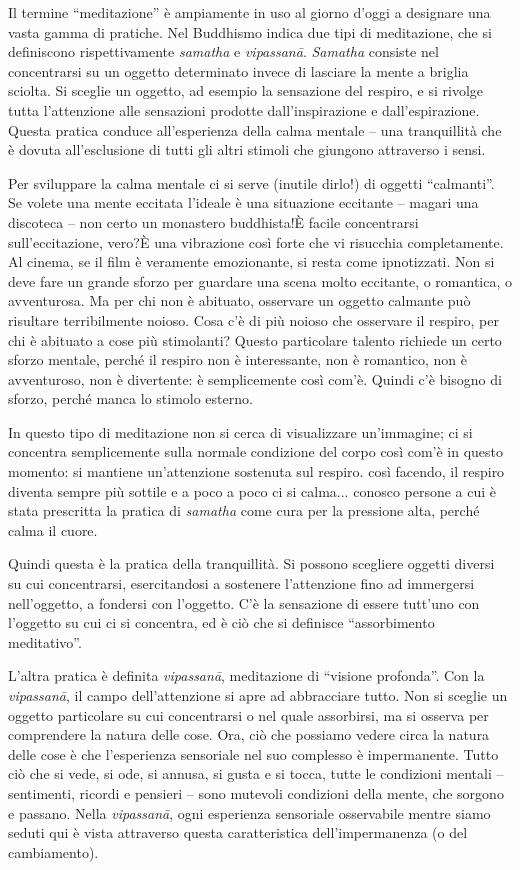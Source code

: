 
Il termine ``meditazione'' è ampiamente in uso al giorno d'oggi a
designare una vasta gamma di pratiche. Nel Buddhismo indica due tipi di
meditazione, che si definiscono rispettivamente \textit{samatha} e \textit{vipassanā}.
\textit{Samatha} consiste nel concentrarsi su un oggetto determinato invece di
lasciare la mente a briglia sciolta. Si sceglie un oggetto, ad esempio
la sensazione del respiro, e si rivolge tutta l'attenzione alle
sensazioni prodotte dall'inspirazione e dall'espirazione. Questa pratica
conduce all'esperienza della calma mentale – una tranquillità che è
dovuta all'esclusione di tutti gli altri stimoli che giungono attraverso
i sensi.

Per sviluppare la calma mentale ci si serve (inutile dirlo!) di oggetti
``calmanti''. Se volete una mente eccitata l'ideale è una situazione
eccitante – magari una discoteca – non certo un monastero buddhista!È
facile concentrarsi sull'eccitazione, vero?È una vibrazione così forte
che vi risucchia completamente. Al cinema, se il film è veramente
emozionante, si resta come ipnotizzati. Non si deve fare un grande
sforzo per guardare una scena molto eccitante, o romantica, o
avventurosa. Ma per chi non è abituato, osservare un oggetto calmante
può risultare terribilmente noioso. Cosa c'è di più noioso che osservare
il respiro, per chi è abituato a cose più stimolanti? Questo particolare
talento richiede un certo sforzo mentale, perché il respiro non è
interessante, non è romantico, non è avventuroso, non è divertente: è
semplicemente così com'è. Quindi c'è bisogno di sforzo, perché manca lo
stimolo esterno.

In questo tipo di meditazione non si cerca di visualizzare un'immagine;
ci si concentra semplicemente sulla normale condizione del corpo così
com'è in questo momento: si mantiene un'attenzione sostenuta sul
respiro. così facendo, il respiro diventa sempre più sottile e a poco a
poco ci si calma... conosco persone a cui è stata prescritta la pratica
di \textit{samatha} come cura per la pressione alta, perché calma il cuore.

Quindi questa è la pratica della tranquillità. Si possono scegliere
oggetti diversi su cui concentrarsi, esercitandosi a sostenere
l'attenzione fino ad immergersi nell'oggetto, a fondersi con l'oggetto.
C'è la sensazione di essere tutt'uno con l'oggetto su cui ci si
concentra, ed è ciò che si definisce ``assorbimento meditativo''.

L'altra pratica è definita \textit{vipassanā}, meditazione di ``visione profonda''.
Con la \textit{vipassanā}, il campo dell'attenzione si apre ad abbracciare tutto.
Non si sceglie un oggetto particolare su cui concentrarsi o nel quale
assorbirsi, ma si osserva per comprendere la natura delle cose. Ora, ciò
che possiamo vedere circa la natura delle cose è che l'esperienza
sensoriale nel suo complesso è impermanente. Tutto ciò che si vede, si
ode, si annusa, si gusta e si tocca, tutte le condizioni mentali –
sentimenti, ricordi e pensieri – sono mutevoli condizioni della mente,
che sorgono e passano. Nella \textit{vipassanā}, ogni esperienza sensoriale
osservabile mentre siamo seduti qui è vista attraverso questa
caratteristica dell'impermanenza (o del cambiamento).

